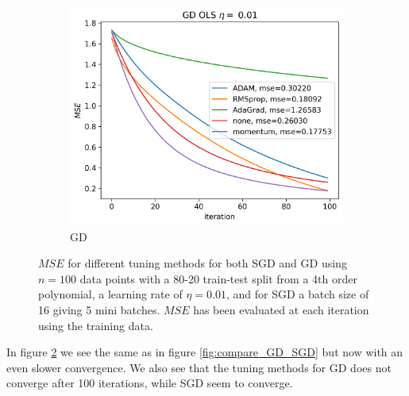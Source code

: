 \documentclass[11pt]{article}
\begin{document}
\begin{figure}[H]
\begin{subfigure}{.5\textwidth}
        \includegraphics[width=\textwidth]{../figures/GD_methods_OLS_eta_0.01.png}
        \caption{GD}
        \label{fig:}
    \end{subfigure}
    \caption{$MSE$ for different tuning methods for both SGD and GD using $n=100$ data points with a 80-20 train-test split from a 4th order polynomial, a learning rate of $\eta=0.01$, and for SGD a batch size of 16 giving 5 mini batches. $MSE$ has been evaluated at each iteration using the training data.}
    \label{fig:compare_GD_SGD_2}
\end{figure}
In figure \ref{fig:compare_GD_SGD_2} we see the same as in figure \ref{fig:compare_GD_SGD} but now with an even slower convergence. We also see that the tuning methods for GD does not converge after 100 iterations, while SGD seem to converge.
\end{document}
